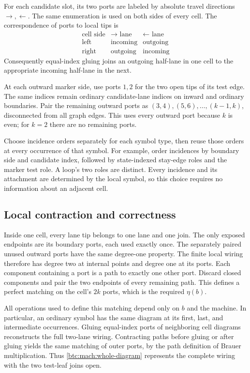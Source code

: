 For each candidate slot, its two ports are labeled by absolute travel
directions $\rightarrow,\leftarrow$. The same enumeration is used on
both sides of every cell. The correspondence of ports to local tips is
\[
 \begin{array}{c|cc}
 \text{cell side}&\rightarrow\text{ lane}&\leftarrow\text{ lane}\\ \hline
 \text{left}&\text{incoming}&\text{outgoing}\\
 \text{right}&\text{outgoing}&\text{incoming}
 \end{array}
\]
Consequently equal-index gluing joins an outgoing half-lane in one cell
to the appropriate incoming half-lane in the next.

At each outward marker side, use ports $1,2$ for the two open tips of
its test edge. The same indices remain ordinary candidate-lane indices
on inward and ordinary boundaries. Pair the remaining outward ports as
$(3,4),(5,6),\ldots,(k-1,k)$, disconnected from all graph edges. This
uses every outward port because $k$ is even; for $k=2$ there are no
remaining ports.

Choose incidence orders separately for each symbol type, then reuse
those orders at every occurrence of that symbol. For example, order
incidences by boundary side and candidate index, followed by state-indexed
stay-edge roles and the marker test role. A loop's two roles are distinct.
Every incidence and its attachment are determined by the local symbol,
so this choice requires no information about an adjacent cell.

\subsection{Local contraction and correctness}

Inside one cell, every lane tip belongs to one lane and one join. The
only exposed endpoints are its boundary ports, each used exactly once.
The separately paired unused outward ports have the same degree-one
property. The finite local wiring therefore has degree two at internal
points and degree one at its ports. Each component containing a port
is a path to exactly one other port. Discard closed components and pair
the two endpoints of every remaining path. This defines a perfect
matching on the cell's $2k$ ports, which is the required $\eta(b)$.

All operations used to define this matching depend only on $b$ and the
machine. In particular, an ordinary symbol has the same diagram at its
first, last, and intermediate occurrences. Gluing equal-index ports of
neighboring cell diagrams reconstructs the full two-lane wiring.
Contracting paths before gluing or after gluing yields the same matching
of outer ports, by the path definition of Brauer multiplication. Thus
\eqref{btc:mach:whole-diagram} represents the complete wiring with the two
test-leaf joins open.

